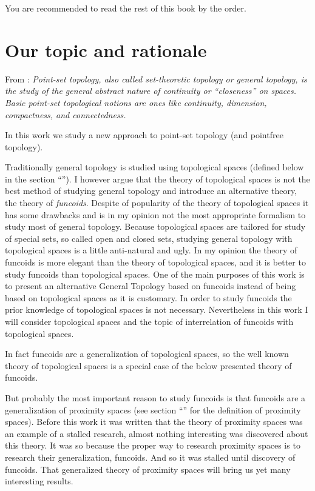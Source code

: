 You are recommended to read the rest of this book by the order.


\section{Our topic and rationale}

From \cite{mw-gen-top}: \emph{Point-set topology, also called set-theoretic
topology or general topology, is the study of the general abstract
nature of continuity or ``closeness'' on spaces. Basic point-set
topological notions are ones like continuity, dimension, compactness,
and connectedness.}

In this work we study a new approach to point-set topology (and pointfree
topology).

Traditionally general topology is studied using topological spaces
(defined below in the section ``''). I however
argue that the theory of topological spaces is not the best method
of studying general topology and introduce an alternative theory,
the theory of \emph{funcoids}. Despite of popularity of the theory
of topological spaces it has some drawbacks and is in my opinion not
the most appropriate formalism to study most of general topology.
Because topological spaces are tailored for study of special sets,
so called open and closed sets, studying general topology with topological
spaces is a little anti-natural and ugly. In my opinion the theory
of funcoids is more elegant than the theory of topological spaces,
and it is better to study funcoids than topological spaces. One of
the main purposes of this work is to present an alternative General
Topology based on funcoids instead of being based on topological spaces
as it is customary. In order to study funcoids the prior knowledge
of topological spaces is not necessary. Nevertheless in this work
I will consider topological spaces and the topic of interrelation
of funcoids with topological spaces.

In fact funcoids are a generalization of topological spaces, so the
well known theory of topological spaces is a special case of the below
presented theory of funcoids.

But probably the most important reason to study funcoids is that funcoids
are a generalization of proximity spaces (see section ``''
for the definition of proximity spaces). Before this work it was written
that the theory of proximity spaces was an example of a stalled research,
almost nothing interesting was discovered about this theory. It was
so because the proper way to research proximity spaces is to research
their generalization, funcoids. And so it was stalled until discovery
of funcoids. That generalized theory of proximity spaces will bring
us yet many interesting results.

